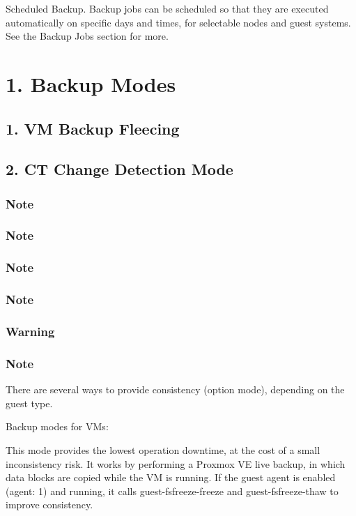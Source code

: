Scheduled Backup. Backup jobs can be scheduled so that they are executed automatically on specific days and times, for selectable nodes and guest systems. See the Backup Jobs section for more.


\section{1. Backup Modes}

\subsection{1. VM Backup Fleecing}

\subsection{2. CT Change Detection Mode}

\subsubsection{Note}

\subsubsection{Note}

\subsubsection{Note}

\subsubsection{Note}

\subsubsection{Warning}

\subsubsection{Note}

There are several ways to provide consistency (option mode), depending on the guest type.

Backup modes for VMs:

This mode provides the lowest operation downtime, at the cost of a small inconsistency risk. It works by performing a Proxmox VE live backup, in which data blocks are copied while the VM is running. If the guest agent is enabled (agent: 1) and running, it calls guest-fsfreeze-freeze and guest-fsfreeze-thaw to improve consistency.

